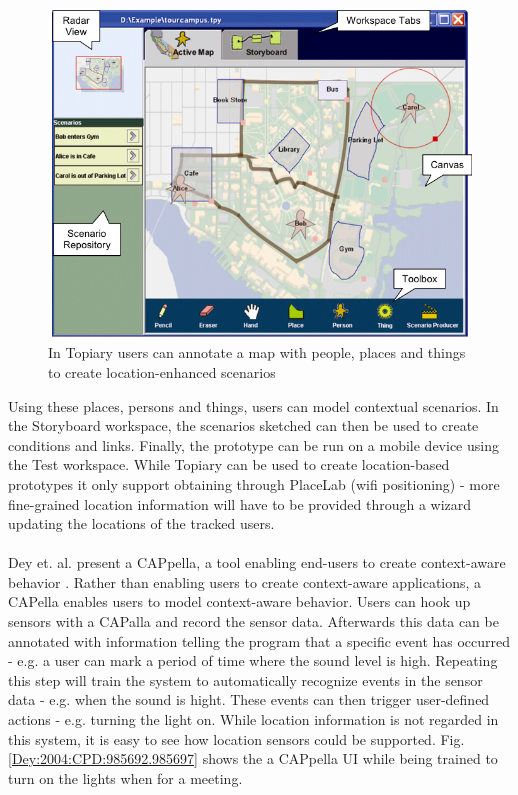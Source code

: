 \begin{figure}
	\centering
	\includegraphics[scale=0.4]{fig/topiary}
	\caption{In Topiary\cite{Li:2004:TTP:1029632.1029671} users can annotate a map with people, places and things to create location-enhanced scenarios}
	\label{fig:topiary}
\end{figure}

Using these places, persons and things, users can model contextual scenarios. In the Storyboard workspace, the scenarios sketched can then be used to create conditions and links. Finally, the prototype can be run on a mobile device using the Test workspace. While Topiary can be used to create location-based prototypes it only support obtaining through PlaceLab (wifi positioning) - more fine-grained location information will have to be provided through a wizard updating the locations of the tracked users. 
\\\\
Dey et. al. present a CAPpella, a tool enabling end-users to create context-aware behavior \cite{Dey:2004:CPD:985692.985697}. Rather than enabling users to create context-aware applications, a CAPella enables users to model context-aware behavior. Users can hook up sensors with a CAPalla and record the sensor data. Afterwards this data can be annotated with information telling the program that a specific event has occurred - e.g. a user can mark a period of time where the sound level is high. Repeating this step will train the system to automatically recognize events in the sensor data - e.g. when the sound is hight. These events can then trigger user-defined actions - e.g. turning the light on. While location information is not regarded in this system, it is easy to see how location sensors could be supported. Fig. \ref{Dey:2004:CPD:985692.985697} shows the a CAPpella UI while being trained to turn on the lights when for a meeting.

